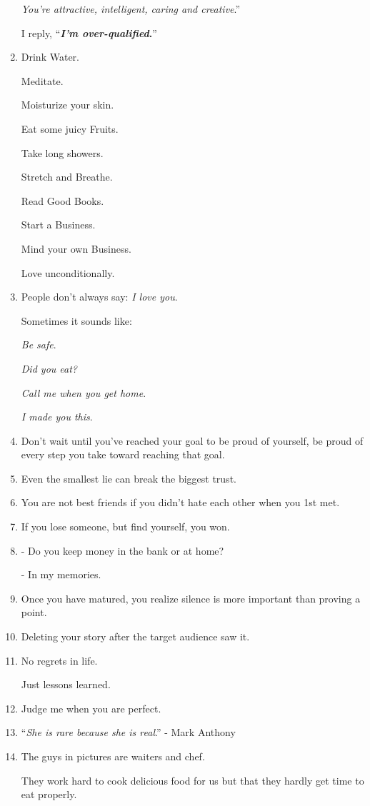 \documentclass{article}
\begin{document}
\begin{enumerate}
	\textit{You're attractive, intelligent, caring and creative}.''
	
	I reply, ``\textbf{\textit{I'm over-qualified}.}''
	\item Drink Water.
	
	Meditate.
	
	Moisturize your skin.
	
	Eat some juicy Fruits.
	
	Take long showers.
	
	Stretch and Breathe.
	
	Read Good Books.
	
	Start a Business.
	
	Mind your own Business.
	
	Love unconditionally.
	\item People don't always say: \textit{I love you}.
	
	Sometimes it sounds like:
	
	\textit{Be safe}.
	
	\textit{Did you eat?}
	
	\textit{Call me when you get home}.
	
	\textit{I made you this}.
	\item Don't wait until you've reached your goal to be proud of yourself, be proud of every step you take toward reaching that goal.
	\item Even the smallest lie can break the biggest trust.
	\item You are not best friends if you didn't hate each other when you 1st met.
	\item If you lose someone, but find yourself, you won.
	\item - Do you keep money in the bank or at home?
	
	- In my memories.
	\item Once you have matured, you realize silence is more important than proving a point.
	\item Deleting your story after the target audience saw it.
	\item No regrets in life.
	
	Just lessons learned.
	\item Judge me when you are perfect.
	\item ``\textit{She is rare because she is real}.'' - Mark Anthony
	\item The guys in pictures are waiters and chef.
	
	They work hard to cook delicious food for us but that they hardly get time to eat properly.
	

\end{enumerate}
\end{document}
